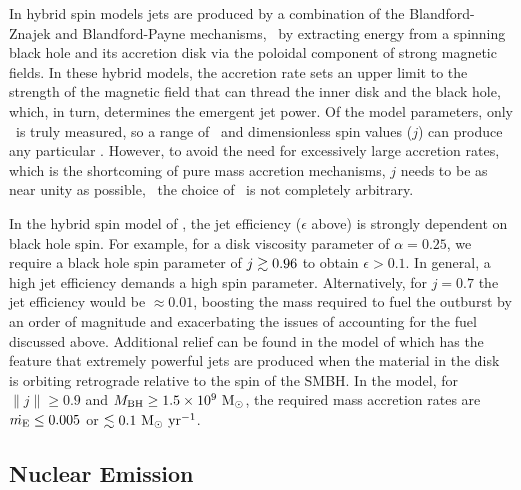 \documentclass[apjpt4]{aastex}
\begin{document}
In hybrid spin models \citep[\eg][]{1999ApJ...522..753M,
  2001ApJ...548L...9M, 2006ApJ...651.1023R, 2007MNRAS.377.1652N,
  2009MNRAS.397.1302B, gesspin} jets are produced by a combination of
the Blandford-Znajek \citep{bz} and Blandford-Payne \citep{bp}
mechanisms, \ie\ by extracting energy from a spinning black hole and
its accretion disk via the poloidal component of strong magnetic
fields. In these hybrid models, the accretion rate sets an upper limit
to the strength of the magnetic field that can thread the inner disk
and the black hole, which, in turn, determines the emergent jet
power. Of the model parameters, only \pjet\ is truly measured, so a
range of \dme\ and dimensionless spin values ($j$) can produce any
particular \pjet. However, to avoid the need for excessively large
accretion rates, which is the shortcoming of pure mass accretion
mechanisms, $j$ needs to be as near unity as possible, \ie\ the choice
of \dme\ is not completely arbitrary.

In the hybrid spin model of \citet{2007MNRAS.377.1652N}, the jet
efficiency ($\epsilon$ above) is strongly dependent on black hole
spin. For example, for a disk viscosity parameter of $\alpha = 0.25$,
we require a black hole spin parameter of $j \gtrsim 0.96$ to obtain
$\epsilon > 0.1$. In general, a high jet efficiency demands a high
spin parameter. Alternatively, for $j = 0.7$ the jet efficiency would
be $\approx 0.01$, boosting the mass required to fuel the outburst by
an order of magnitude and exacerbating the issues of accounting for
the fuel discussed above. Additional relief can be found in the model
of \citet{gesspin} which has the feature that extremely powerful jets
are produced when the material in the disk is orbiting retrograde
relative to the spin of the SMBH. In the \citet{gesspin} model, for
$\|j\| \ge 0.9$ and $M_{\rm{BH}} \ge 1.5 \times 10^9 ~\rm{M_{\odot}}$, the required
mass accretion rates are $\dot{m_{\rm{E}}} \le 0.005$ or $\lesssim 0.1 ~\mbox{\ensuremath{\rm{M_{\odot}}~\rm{\mbox{\ensuremath{\rm{yr}}}^{-1}}}}$.

\subsection{Nuclear Emission}
\label{sec:nuc}
\end{document}
